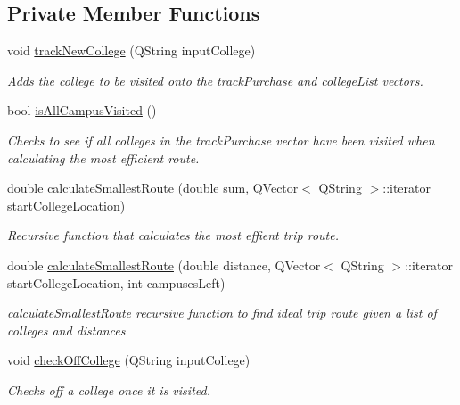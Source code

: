 \subsection*{Private Member Functions}
\begin{DoxyCompactItemize}
\item 
void \hyperlink{class_trip_a65fa30762ec89db37069a7180b22f939}{track\+New\+College} (Q\+String input\+College)
\begin{DoxyCompactList}\small\item\em Adds the college to be visited onto the track\+Purchase and college\+List vectors. \end{DoxyCompactList}\item 
bool \hyperlink{class_trip_adbcef3d2967bde8ee8439ca2664e5559}{is\+All\+Campus\+Visited} ()
\begin{DoxyCompactList}\small\item\em Checks to see if all colleges in the track\+Purchase vector have been visited when calculating the most efficient route. \end{DoxyCompactList}\item 
double \hyperlink{class_trip_a4b791f97dbeb09fbe4019699d6bbcef4}{calculate\+Smallest\+Route} (double sum, Q\+Vector$<$ Q\+String $>$\+::iterator start\+College\+Location)
\begin{DoxyCompactList}\small\item\em Recursive function that calculates the most effient trip route. \end{DoxyCompactList}\item 
double \hyperlink{class_trip_a1cd33b18e21d02a7bba297b94f9c9825}{calculate\+Smallest\+Route} (double distance, Q\+Vector$<$ Q\+String $>$\+::iterator start\+College\+Location, int campuses\+Left)
\begin{DoxyCompactList}\small\item\em calculate\+Smallest\+Route recursive function to find ideal trip route given a list of colleges and distances \end{DoxyCompactList}\item 
void \hyperlink{class_trip_a4959e64f6d27c6fc32b159ec2f6d4521}{check\+Off\+College} (Q\+String input\+College)
\begin{DoxyCompactList}\small\item\em Checks off a college once it is visited. \end{DoxyCompactList}\end{DoxyCompactItemize}
